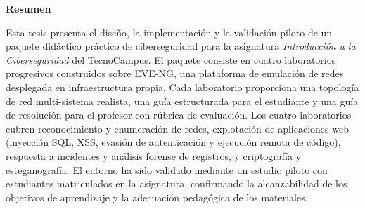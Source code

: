 \begin{small}
\bigskip
\noindent\textbf{Resumen}

\smallskip
\noindent Esta tesis presenta el diseño, la implementación y la validación piloto de un
paquete didáctico práctico de ciberseguridad para la asignatura \textit{Introducción
a la Ciberseguridad} del TecnoCampus. El paquete consiste en cuatro laboratorios
progresivos construidos sobre EVE-NG, una plataforma de emulación de redes
desplegada en infraestructura propia. Cada laboratorio proporciona una topología
de red multi-sistema realista, una guía estructurada para el estudiante y una
guía de resolución para el profesor con rúbrica de evaluación. Los cuatro
laboratorios cubren reconocimiento y enumeración de redes, explotación de
aplicaciones web (inyección SQL, XSS, evasión de autenticación y ejecución remota
de código), respuesta a incidentes y análisis forense de registros, y criptografía
y esteganografía. El entorno ha sido validado mediante un estudio piloto con
estudiantes matriculados en la asignatura, confirmando la alcanzabilidad de los
objetivos de aprendizaje y la adecuación pedagógica de los materiales.

\end{small}
\cleardoublepage
